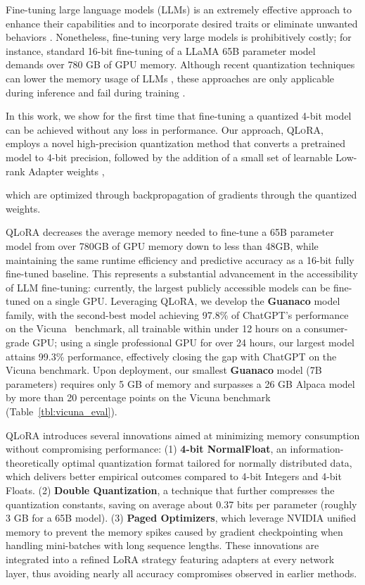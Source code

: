 Fine-tuning large language models (LLMs) is an extremely effective approach to enhance their capabilities \citep{min2021metaicl, wei2021finetuned, ouyang2022training, wang2022super, wang2022self, liu2022few} and to incorporate desired traits or eliminate unwanted behaviors \citep{ouyang2022training, askell2021general, bai2022training}. Nonetheless, fine-tuning very large models is prohibitively costly; for instance, standard 16-bit fine-tuning of a LLaMA 65B parameter model~\citep{touvron2023llama} demands over 780 GB of GPU memory. Although recent quantization techniques can lower the memory usage of LLMs \citep{dettmers2022llm, dettmers2022case, frantar2022gptq, xiao2022smoothquant}, these approaches are only applicable during inference and fail during training \citep{wortsman2023stable}.

In this work, we show for the first time that fine-tuning a quantized 4-bit model can be achieved without any loss in performance. Our approach, \textsc{QLoRA}, employs a novel high-precision quantization method that converts a pretrained model to 4-bit precision, followed by the addition of a small set of learnable Low-rank Adapter weights \citep{hu2021lora}, 

which are optimized through backpropagation of gradients through the quantized weights. 

\textsc{QLoRA} decreases the average memory needed to fine-tune a 65B parameter model from over 780GB of GPU memory down to less than 48GB, while maintaining the same runtime efficiency and predictive accuracy as a 16-bit fully fine-tuned baseline. This represents a substantial advancement in the accessibility of LLM fine-tuning: currently, the largest publicly accessible models can be fine-tuned on a single GPU. Leveraging \textsc{QLoRA}, we develop the \textbf{Guanaco} model family, with the second-best model achieving 97.8\% of ChatGPT’s performance on the Vicuna~\citep{vicuna2023} benchmark, all trainable within under 12 hours on a consumer-grade GPU; using a single professional GPU for over 24 hours, our largest model attains 99.3\% performance, effectively closing the gap with ChatGPT on the Vicuna benchmark. Upon deployment, our smallest \textbf{Guanaco} model (7B parameters) requires only 5 GB of memory and surpasses a 26 GB Alpaca model by more than 20 percentage points on the Vicuna benchmark (Table~\ref{tbl:vicuna_eval}).

\textsc{QLoRA} introduces several innovations aimed at minimizing memory consumption without compromising performance: (1) \textbf{4-bit NormalFloat}, an information-theoretically optimal quantization format tailored for normally distributed data, which delivers better empirical outcomes compared to 4-bit Integers and 4-bit Floats. (2) \textbf{Double Quantization}, a technique that further compresses the quantization constants, saving on average about 0.37 bits per parameter (roughly 3 GB for a 65B model). (3) \textbf{Paged Optimizers}, which leverage NVIDIA unified memory to prevent the memory spikes caused by gradient checkpointing when handling mini-batches with long sequence lengths. These innovations are integrated into a refined LoRA strategy featuring adapters at every network layer, thus avoiding nearly all accuracy compromises observed in earlier methods.

